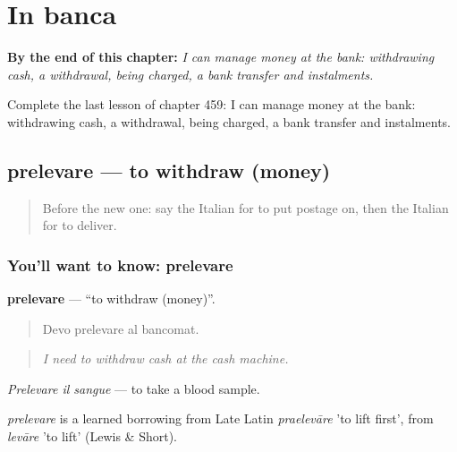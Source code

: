 
\chapter{In banca}
\label{ch:it-in-banca}

\begin{chapteropening}
\textbf{By the end of this chapter:} \emph{I can manage money at the bank: withdrawing cash, a withdrawal, being charged, a bank transfer and instalments.}

Complete the last lesson of chapter 459: I can manage money at the bank: withdrawing cash, a withdrawal, being charged, a bank transfer and instalments.
\end{chapteropening}

\section[prelevare]{prelevare — to withdraw (money)}

\label{lesson:IT-C459-prelevare}



\begin{quote}
Before the new one: say the Italian for to put postage on, then the Italian for to deliver.
\end{quote}

\subsection*{You'll want to know: prelevare}
\textbf{prelevare} — \textquotedblleft{}to withdraw (money)\textquotedblright{}.

\begin{quote}
Devo prelevare al bancomat.
\end{quote}

\begin{quote}
\emph{I need to withdraw cash at the cash machine.}
\end{quote}

\emph{Prelevare il sangue} — to take a blood sample.

\begin{cousinweb}
\emph{prelevare} is a learned borrowing from Late Latin \emph{praelevāre} 'to lift first', from \emph{levāre} 'to lift' (Lewis \& Short).
\end{cousinweb}

